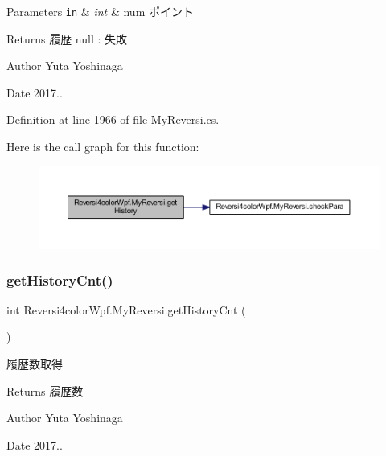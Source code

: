 \begin{DoxyParams}[1]{Parameters}
\mbox{\tt in}  & {\em int} & num ポイント \\
\hline
\end{DoxyParams}
\begin{DoxyReturn}{Returns}
履歴 null \+: 失敗 
\end{DoxyReturn}
\begin{DoxyAuthor}{Author}
Yuta Yoshinaga 
\end{DoxyAuthor}
\begin{DoxyDate}{Date}
2017.. 
\end{DoxyDate}


Definition at line 1966 of file My\+Reversi.\+cs.

Here is the call graph for this function\+:
\nopagebreak
\begin{figure}[H]
\begin{center}
\leavevmode
\includegraphics[width=350pt]{class_reversi4color_wpf_1_1_my_reversi_a2e7355e057594ba70b777cf179a94d41_cgraph}
\end{center}
\end{figure}
\mbox{\label{class_reversi4color_wpf_1_1_my_reversi_aa74fd4473c82625f169f3e5a18d155b2}} 
\subsubsection{\texorpdfstring{get\+History\+Cnt()}{getHistoryCnt()}}
{\footnotesize\ttfamily int Reversi4color\+Wpf.\+My\+Reversi.\+get\+History\+Cnt (\begin{DoxyParamCaption}{ }\end{DoxyParamCaption})}



履歴数取得 

\begin{DoxyReturn}{Returns}
履歴数 
\end{DoxyReturn}
\begin{DoxyAuthor}{Author}
Yuta Yoshinaga 
\end{DoxyAuthor}
\begin{DoxyDate}{Date}
2017.. 
\end{DoxyDate}


